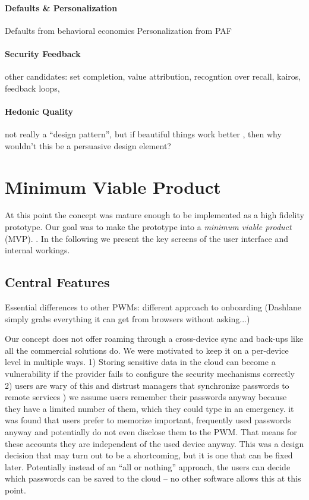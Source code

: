 \paragraph{Defaults \& Personalization}
Defaults from behavioral economics
Personalization from PAF


\paragraph{Security Feedback}
other candidates: set completion, value attribution, recogntion over recall, kairos, feedback loops, 

\paragraph{Hedonic Quality}
not really a ``design pattern'', but if beautiful things work better \cite{Tractinsky1997, Fogg2001WhatMakesSitesCredible}, then why wouldn't this be a persuasive design element?

\section{Minimum Viable Product}
At this point the concept was mature enough to be implemented as a high fidelity prototype. Our goal was to make the prototype into a \textit{minimum viable product} (MVP). . In the following we present the key screens of the user interface and internal workings. %


\subsection{Central Features}
Essential differences to other PWMs: different approach to onboarding (Dashlane simply grabs everything it can get from browsers without asking...)

Our concept does not offer roaming through a cross-device sync and back-ups like all the commercial solutions do. We were motivated to keep it on a per-device level in multiple ways. 1) Storing sensitive data in the cloud can become a vulnerability if the provider fails to configure the security mechanisms correctly 2) users are wary of this and distrust managers that synchronize passwords to remote services ) we assume users remember their passwords anyway because they have a limited number of them, which they could type in an emergency. it was found that users prefer to memorize important, frequently used passwords anyway and potentially do not even disclose them to the PWM. That means for these accounts they are independent of the used device anyway. This was a design decision that may turn out to be a shortcoming, but it is one that can be fixed later. Potentially instead of an ``all or nothing'' approach, the users can decide which passwords can be saved to the cloud -- no other software allows this at this point. 


